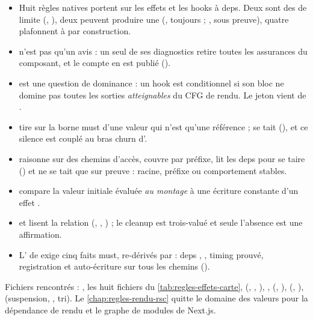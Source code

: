 \begin{resume}
\begin{itemize}
  \item Huit règles natives portent sur les effets et les hooks à deps. Deux sont des \Info{} de limite (, ), deux peuvent produire une \Error{} (, toujours ; , sous preuve), quatre plafonnent à \Warning{} par construction.
  \item {} n'est pas qu'un avis : un seul de ses diagnostics retire toutes les assurances  du composant, et le compte en est publié ().
  \item {} est une question de dominance : un hook est conditionnel si son bloc ne domine pas toutes les sorties \emph{atteignables} du CFG de rendu. Le jeton  vient de .
  \item {} tire sur la borne must  d'une valeur qui n'est qu'une référence ;  se tait (), et ce silence est couplé au bras churn d'.
  \item {} raisonne sur des chemins d'accès, couvre par préfixe, lit les deps pour se taire () et ne se tait que sur preuve : racine, préfixe ou comportement stables.
  \item {} compare la valeur initiale évaluée \emph{au montage} à une écriture constante d'un effet \code{[]}.
  \item {} et  lisent la relation  (, , ) ; le cleanup est trois-valué et seule l'absence est une affirmation.
  \item L'\Error{} de  exige cinq faits must, re-dérivés par  : deps \code{[]}, , timing prouvé, registration et auto-écriture sur tous les chemins ().
\end{itemize}
{\sloppy Fichiers rencontrés : , les huit fichiers du \cref{tab:regles-effets-carte},  (, , ), ,  (, ),  (, ),  (suspension, , tri). Le \cref{chap:regles-rendu-rsc} quitte le domaine des valeurs pour la dépendance de rendu et le graphe de modules de Next.js.\par}
\end{resume}

